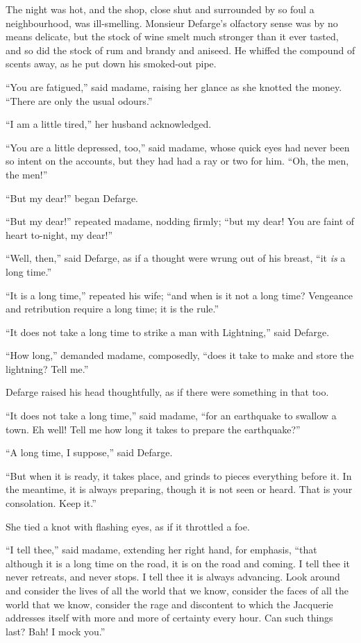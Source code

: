 The night was hot, and the shop, close shut and surrounded by so foul
a neighbourhood, was ill-smelling.  Monsieur Defarge's olfactory
sense was by no means delicate, but the stock of wine smelt much
stronger than it ever tasted, and so did the stock of rum and brandy
and aniseed.  He whiffed the compound of scents away, as he put down
his smoked-out pipe.

``You are fatigued,'' said madame, raising her glance as she knotted
the money.  ``There are only the usual odours.''

``I am a little tired,'' her husband acknowledged.

``You are a little depressed, too,'' said madame, whose quick eyes had
never been so intent on the accounts, but they had had a ray or two
for him.  ``Oh, the men, the men!''

``But my dear!'' began Defarge.

``But my dear!'' repeated madame, nodding firmly; ``but my dear!
You are faint of heart to-night, my dear!''

``Well, then,'' said Defarge, as if a thought were wrung out of his breast,
``it \emph{is} a long time.''

``It is a long time,'' repeated his wife; ``and when is it not a long time?
Vengeance and retribution require a long time; it is the rule.''

``It does not take a long time to strike a man with Lightning,''
said Defarge.

``How long,'' demanded madame, composedly, ``does it take to make and
store the lightning?  Tell me.''

Defarge raised his head thoughtfully, as if there were something
in that too.

``It does not take a long time,'' said madame, ``for an earthquake to swallow
a town.  Eh well!  Tell me how long it takes to prepare the earthquake?''

``A long time, I suppose,'' said Defarge.

``But when it is ready, it takes place, and grinds to pieces everything
before it.  In the meantime, it is always preparing, though it is not
seen or heard.  That is your consolation.  Keep it.''

She tied a knot with flashing eyes, as if it throttled a foe.

``I tell thee,'' said madame, extending her right hand, for emphasis,
``that although it is a long time on the road, it is on the road and
coming.  I tell thee it never retreats, and never stops.  I tell thee
it is always advancing.  Look around and consider the lives of all the
world that we know, consider the faces of all the world that we know,
consider the rage and discontent to which the Jacquerie addresses itself
with more and more of certainty every hour.  Can such things last?
Bah!  I mock you.''

